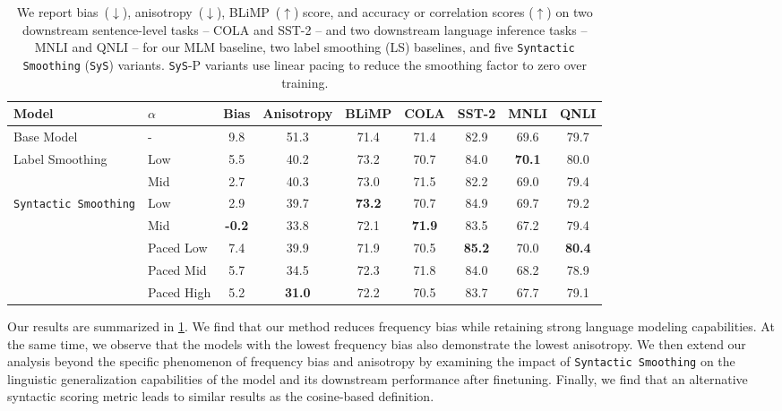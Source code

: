 \begin{table}[ht!]
\centering
\small
\begin{tabular}{ll||cc|ccccc}
\toprule
\textbf{Model}  & $\alpha$ & \textbf{Bias}  & \textbf{Anisotropy} & \textbf{BLiMP} & \textbf{COLA} & \textbf{SST-2} & \textbf{MNLI} & \textbf{QNLI}  \\
\midrule
Base Model & -&9.8 & 51.3 & 71.4 & 71.4 & 82.9 & 69.6 & 79.7 \\
\midrule
\multirow{2}{*}{Label Smoothing} &Low & 5.5 & 40.2 & 73.2 & 70.7 & 84.0 & \textbf{70.1} & 80.0 \\
&Mid & 2.7  & 40.3 & 73.0 & 71.5 & 82.2 & 69.0 & 79.4 \\
\midrule
\multirow{5}{*}{\texttt{Syntactic Smoothing}}&Low  & 2.9 & 39.7 & \textbf{73.2} & 70.7 & 84.9 & 69.7 & 79.2 \\
&Mid  & \textbf{-0.2} & 33.8 & 72.1 & \textbf{71.9} & 83.5 & 67.2 & 79.4 \\
&Paced Low & 7.4 & 39.9 & 71.9 & 70.5 & \textbf{85.2} & 70.0 & \textbf{80.4}\\ 
&Paced Mid& 5.7 & 34.5 & 72.3 & 71.8 & 84.0 & 68.2 & 78.9\\ 
&Paced High & 5.2 & \textbf{31.0} & 72.2 & 70.5 & 83.7 & 67.7 & 79.1 \\ 
\bottomrule
\end{tabular}
\caption{\label{tbl:full-results} We report bias~($\downarrow$), anisotropy~($\downarrow$), BLiMP~($\uparrow$) score, and accuracy or correlation scores ($\uparrow$) on two downstream sentence-level tasks -- COLA and SST-2 -- and two downstream language inference tasks -- MNLI and QNLI -- for our MLM baseline, two label smoothing (LS) baselines, and five \texttt{Syntactic Smoothing} (\texttt{SyS}) variants. \texttt{SyS}-P variants use linear pacing to reduce the smoothing factor to zero over training.}
\end{table}

Our results are summarized in \cref{tbl:full-results}. We find that our method reduces frequency bias while retaining strong language modeling capabilities. At the same time, we observe that the models with the lowest frequency bias also demonstrate the lowest anisotropy. We then extend our analysis beyond the specific phenomenon of frequency bias and anisotropy by examining the impact of \texttt{Syntactic Smoothing} on the linguistic generalization capabilities of the model and its downstream performance after finetuning. Finally, we find that an alternative syntactic scoring metric leads to similar results as the cosine-based definition.

